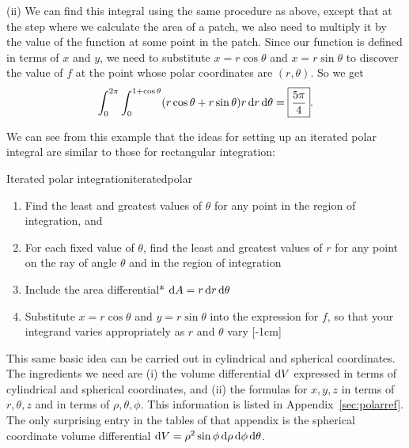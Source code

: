 \documentclass{watsonbook}
\begin{document}
\begin{solution}
              
    (ii) We can find this integral using the same procedure as above,
    except that at the step where we calculate the area of a patch, we
    also need to multiply it by the value of the function at some point
    in the patch. Since our function is defined in terms of $x$ and
    $y$, we need to substitute $x = r\cos \theta$ and $x = r\sin
    \theta$ to discover the value of $f$ at the point whose polar
    coordinates are $(r,\theta)$. So we get
    \[
      \int_0^{2\pi} \int_0^{1+\cos \theta} (r \cos\theta + r\sin
      \theta)r \, {\mathrm{d}}r \, \mathrm{d}\theta = \boxed{\frac{5\pi}{4}}. 
    \]
\end{solution}

We can see from this example that the ideas for setting up an iterated
polar integral are similar to those for 
rectangular integration:
\begin{obs}{Iterated polar integration}{iteratedpolar}
\begin{enumerate}[itemsep = 6pt, topsep = 5pt, leftmargin=12pt]
\item Find the least and greatest values of $\theta$ for any point in
  the region of integration, and 
\item For each fixed value of $\theta$, find the least and greatest
  values of $r$ for any point on the ray of angle $\theta$ and in the
  region of integration
\item Include the area differential* $\mathrm{d} A = r \, {\mathrm{d}}r \, \mathrm{d}\theta$
\item Substitute $x = r \cos\theta$ and $y=r\sin \theta$ into the
  expression for $f$, so
  that your integrand varies appropriately as $r$ and $\theta$ vary 
  [-1cm]
\end{enumerate}
\end{obs}

This same basic idea can be carried out in cylindrical and spherical
coordinates. The ingredients we need are (i) the volume differential
$\mathrm{d} V$ expressed in terms of cylindrical and spherical coordinates, and
(ii) the formulas for $x, y, z$ in terms of $r, \theta, z$ and in
terms of $\rho, \theta, \phi$. This information is listed in
Appendix~\ref{sec:polarref}. The only surprising entry in the tables
of that appendix is the spherical coordinate volume differential $\mathrm{d} V =
\rho^2 \sin \phi \, {\mathrm{d}}\rho \, {\mathrm{d}} \phi \, \mathrm{d}\theta$.
\end{document}
